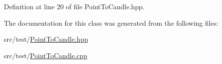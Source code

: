 Definition at line 20 of file Point\-To\-Candle.\-hpp.



The documentation for this class was generated from the following files\-:\begin{DoxyCompactItemize}
\item 
src/test/\hyperlink{PointToCandle_8hpp}{Point\-To\-Candle.\-hpp}\item 
src/test/\hyperlink{PointToCandle_8cpp}{Point\-To\-Candle.\-cpp}\end{DoxyCompactItemize}
